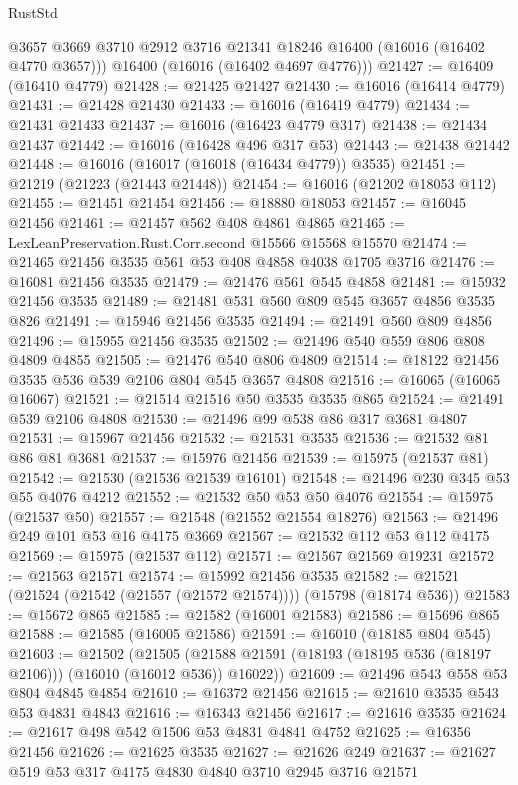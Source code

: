 \begin{lexlean}{RustStd}
\begin{coremodule}
        @3657
        @3669
        @3710
        @2912
        @3716
        @21341
        @18246
        @16400
        (@16016 (@16402 @4770 @3657)))
      @16400
      (@16016 (@16402 @4697 @4776)))
@21427 := @16409 (@16410 @4779)
@21428 := @21425 @21427
@21430 := @16016 (@16414 @4779)
@21431 := @21428 @21430
@21433 := @16016 (@16419 @4779)
@21434 := @21431 @21433
@21437 := @16016 (@16423 @4779 @317)
@21438 := @21434 @21437
@21442 := @16016 (@16428 @496 @317 @53)
@21443 := @21438 @21442
@21448 := @16016 (@16017 (@16018 (@16434 @4779)) @3535)
@21451 := @21219 (@21223 (@21443 @21448))
@21454 := @16016 (@21202 @18053 @112)
@21455 := @21451 @21454
@21456 := @18880 @18053
@21457 := @16045 @21456
@21461 := @21457 @562 @408 @4861 @4865
@21465 := LexLeanPreservation.Rust.Corr.second @15566 @15568 @15570
@21474 := @21465 @21456 @3535 @561 @53 @408 @4858 @4038 @1705 @3716
@21476 := @16081 @21456 @3535
@21479 := @21476 @561 @545 @4858
@21481 := @15932 @21456 @3535
@21489 := @21481 @531 @560 @809 @545 @3657 @4856 @3535 @826
@21491 := @15946 @21456 @3535
@21494 := @21491 @560 @809 @4856
@21496 := @15955 @21456 @3535
@21502 := @21496 @540 @559 @806 @808 @4809 @4855
@21505 := @21476 @540 @806 @4809
@21514 := @18122 @21456 @3535 @536 @539 @2106 @804 @545 @3657 @4808
@21516 := @16065 (@16065 @16067)
@21521 := @21514 @21516 @50 @3535 @3535 @865
@21524 := @21491 @539 @2106 @4808
@21530 := @21496 @99 @538 @86 @317 @3681 @4807
@21531 := @15967 @21456
@21532 := @21531 @3535
@21536 := @21532 @81 @86 @81 @3681
@21537 := @15976 @21456
@21539 := @15975 (@21537 @81)
@21542 := @21530 (@21536 @21539 @16101)
@21548 := @21496 @230 @345 @53 @55 @4076 @4212
@21552 := @21532 @50 @53 @50 @4076
@21554 := @15975 (@21537 @50)
@21557 := @21548 (@21552 @21554 @18276)
@21563 := @21496 @249 @101 @53 @16 @4175 @3669
@21567 := @21532 @112 @53 @112 @4175
@21569 := @15975 (@21537 @112)
@21571 := @21567 @21569 @19231
@21572 := @21563 @21571
@21574 := @15992 @21456 @3535
@21582 := @21521 (@21524 (@21542 (@21557 (@21572 @21574)))) (@15798 (@18174 @536))
@21583 := @15672 @865
@21585 := @21582 (@16001 @21583)
@21586 := @15696 @865
@21588 := @21585 (@16005 @21586)
@21591 := @16010 (@18185 @804 @545)
@21603 := @21502
    (@21505 (@21588 @21591 (@18193 (@18195 @536 (@18197 @2106))) (@16010 (@16012 @536)) @16022))
@21609 := @21496 @543 @558 @53 @804 @4845 @4854
@21610 := @16372 @21456
@21615 := @21610 @3535 @543 @53 @4831 @4843
@21616 := @16343 @21456
@21617 := @21616 @3535
@21624 := @21617 @498 @542 @1506 @53 @4831 @4841 @4752
@21625 := @16356 @21456
@21626 := @21625 @3535
@21627 := @21626 @249
@21637 := @21627 @519 @53 @317 @4175 @4830 @4840 @3710 @2945 @3716 @21571

\end{coremodule}
\end{lexlean}
